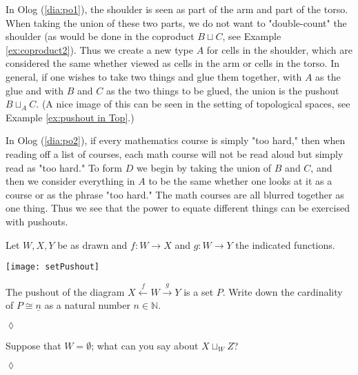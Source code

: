 \documentclass{book}
\def\NN{{\mathbb N}}
\def\to{\rightarrow}
\def\taking{\colon}
\def\iso{\cong}
\def\ul{\underline}
\newcommand{\Too}[1]{\xrightarrow{\ \ #1\ \ }}
\newcommand{\Fromm}[1]{\xleftarrow{\ \ #1\ \ }}
\theoremstyle{theoremENG}
\theoremstyle{lemmaENG}
\theoremstyle{propositionENG}
\theoremstyle{corollaryENG}
\theoremstyle{factENG}
\theoremstyle{remarkENG}
\theoremstyle{exampleENG}
\newtheorem{exampleENG}[subsubsection]{\begin{english}Example\end{english}}
\theoremstyle{warningENG}
\theoremstyle{questionENG}
\theoremstyle{guessENG}
\theoremstyle{answerENG}
\theoremstyle{constructionENG}
\theoremstyle{rulesENG}
\theoremstyle{excENG}
\newtheorem{excENG}[subsubsection]{\begin{english}Exercise\end{english}}
\theoremstyle{appENG}
\theoremstyle{definitionENG}
\theoremstyle{notationENG}
\theoremstyle{conjectureENG}
\theoremstyle{postulateENG}
\newenvironment{exerciseENG}{\begin{excENG}}{\hspace*{\fill}$\lozenge$\end{excENG}}
\theoremstyle{theoremRUS}
\theoremstyle{lemmaRUS}
\theoremstyle{propositionRUS}
\theoremstyle{corollaryRUS}
\theoremstyle{factRUS}
\theoremstyle{remarkRUS}
\theoremstyle{exampleRUS}
\theoremstyle{warningRUS}
\theoremstyle{questionRUS}
\theoremstyle{guessRUS}
\theoremstyle{answerRUS}
\theoremstyle{constructionRUS}
\theoremstyle{rulesRUS}
\theoremstyle{excRUS}
\theoremstyle{appRUS}
\theoremstyle{definitionRUS}
\theoremstyle{notationRUS}
\theoremstyle{conjectureRUS}
\theoremstyle{postulateRUS}
\begin{document}
\begin{english}
\begin{exampleENG}[Pushout]
In Olog (\ref{dia:po1}), the shoulder is seen as part of the arm and part of the torso.  When taking the union of these two parts, we do not want to "double-count" the shoulder (as would be done in the coproduct $B\sqcup C$, see Example \ref{ex:coproduct2}).  Thus we create a new type $A$ for cells in the shoulder, which are considered the same whether viewed as cells in the arm or cells in the torso.  In general, if one wishes to take two things and glue them together, with $A$ as the glue and with $B$ and $C$ as the two things to be glued, the union is the pushout $B\sqcup_AC$. (A nice image of this can be seen in the setting of topological spaces, see Example \ref{ex:pushout in Top}.)

\begin{russian} \end{russian}

In Olog (\ref{dia:po2}), if every mathematics course is simply "too hard," then when reading off a list of courses, each math course will not be read aloud but simply read as "too hard."  To form $D$ we begin by taking the union of $B$ and $C$, and then we consider everything in $A$ to be the same whether one looks at it as a course or as the phrase "too hard."  The math courses are all blurred together as one thing.  Thus we see that the power to equate different things can be exercised with pushouts.

\begin{russian} \end{russian}

\end{exampleENG}

\begin{exerciseENG}

Let $W,X,Y$ be as drawn and $f\taking W\to X$ and $g\taking W\to Y$ the indicated functions. 
\begin{center}
\texttt{[image: setPushout]}
\end{center}
The pushout of the diagram $X\Fromm{f}W\Too{g}Y$ is a set $P$. Write down the cardinality of $P\iso\ul{n}$ as a natural number $n\in\NN$.  

\begin{russian} \end{russian}

\end{exerciseENG}

\begin{exerciseENG}

Suppose that $W=\emptyset$; what can you say about $X\sqcup_WZ$? 


\end{exerciseENG}
\end{english}
\end{document}
